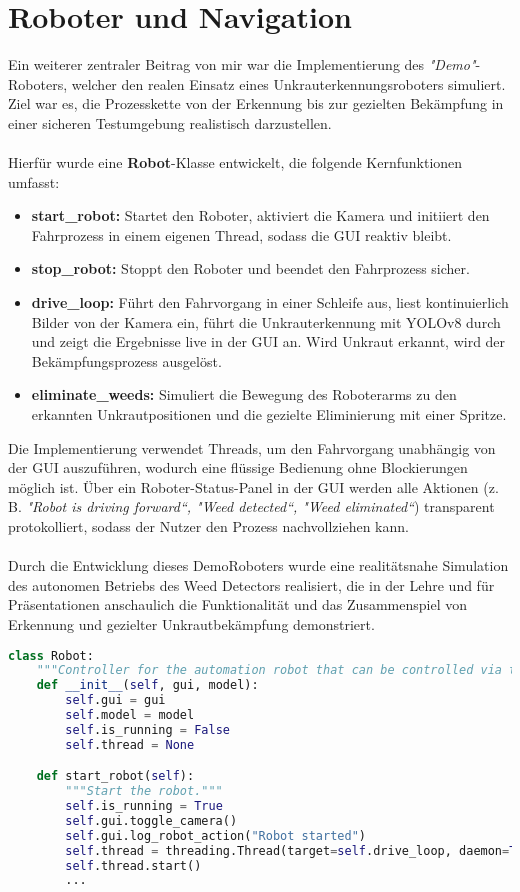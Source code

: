 \documentclass[12pt, a4paper]{scrreprt}
\begin{document}
\chapter{Roboter und Navigation}
Ein weiterer zentraler Beitrag von mir war die Implementierung des \emph{"Demo"}-Roboters, welcher den realen Einsatz eines Unkrauterkennungsroboters simuliert. Ziel war es, die Prozesskette von der Erkennung bis zur gezielten Bekämpfung in einer sicheren Testumgebung realistisch darzustellen.\\
\\
Hierfür wurde eine \textbf{Robot}-Klasse entwickelt, die folgende Kernfunktionen umfasst:
\begin{itemize}
    \item \textbf{start\_robot:} Startet den Roboter, aktiviert die Kamera und initiiert den Fahrprozess in einem eigenen Thread, sodass die GUI reaktiv bleibt.
    \item \textbf{stop\_robot:} Stoppt den Roboter und beendet den Fahrprozess sicher.
    \item \textbf{drive\_loop:} Führt den Fahrvorgang in einer Schleife aus, liest kontinuierlich Bilder von der Kamera ein, führt die Unkrauterkennung mit YOLOv8 durch und zeigt die Ergebnisse live in der GUI an. Wird Unkraut erkannt, wird der Bekämpfungsprozess ausgelöst.
    \item \textbf{eliminate\_weeds:} Simuliert die Bewegung des Roboterarms zu den erkannten Unkrautpositionen und die gezielte Eliminierung mit einer Spritze.
\end{itemize}
Die Implementierung verwendet Threads, um den Fahrvorgang unabhängig von der GUI auszuführen, wodurch eine flüssige Bedienung ohne Blockierungen möglich ist. Über ein Roboter-Status-Panel in der GUI werden alle Aktionen (z. B. \emph{"Robot is driving forward“, "Weed detected“, "Weed eliminated“}) transparent protokolliert, sodass der Nutzer den Prozess nachvollziehen kann.\\
\\
Durch die Entwicklung dieses DemoRoboters wurde eine realitätsnahe Simulation des autonomen Betriebs des Weed Detectors realisiert, die in der Lehre und für Präsentationen anschaulich die Funktionalität und das Zusammenspiel von Erkennung und gezielter Unkrautbekämpfung demonstriert.\\

\begin{lstlisting}[language=Python, caption=Auszug Robot-Klasse]
class Robot:
    """Controller for the automation robot that can be controlled via the GUI."""
    def __init__(self, gui, model):
        self.gui = gui
        self.model = model
        self.is_running = False
        self.thread = None

    def start_robot(self):
        """Start the robot."""
        self.is_running = True
        self.gui.toggle_camera()
        self.gui.log_robot_action("Robot started")
        self.thread = threading.Thread(target=self.drive_loop, daemon=True)
        self.thread.start()
        ...
\end{lstlisting}
\end{document}
